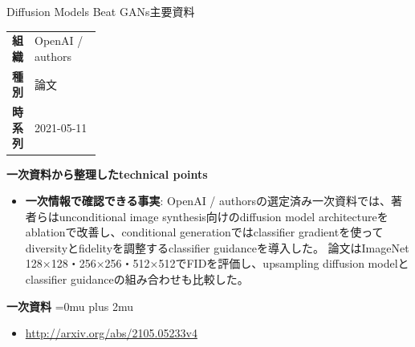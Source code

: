 \begin{technicalnote}{Diffusion Models Beat GANs}{主要資料}
\begingroup
\begin{tabularx}{\linewidth}{@{}>{\bfseries}p{0.22\linewidth}X@{}}
組織 & OpenAI / authors \\
種別 & 論文 \\
時系列 & 2021-05-11 \\
\end{tabularx}
\smallskip
{\bfseries 一次資料から整理したtechnical points}
\begin{itemize}[leftmargin=1.5em,itemsep=0.35em]
\item \textbf{一次情報で確認できる事実}: OpenAI / authorsの選定済み一次資料では、著者らはunconditional image synthesis向けのdiffusion model architectureをablationで改善し、conditional generationではclassifier gradientを使ってdiversityとfidelityを調整するclassifier guidanceを導入した。 論文はImageNet 128×128・256×256・512×512でFIDを評価し、upsampling diffusion modelとclassifier guidanceの組み合わせも比較した。
\end{itemize}
\begin{minipage}{\linewidth}
\begin{samepage}
{\bfseries 一次資料}
\begingroup\sloppy
\Urlmuskip=0mu plus 2mu\relax
\begin{itemize}[leftmargin=1.5em,itemsep=0.25em]
\item {\scriptsize\url{http://arxiv.org/abs/2105.05233v4}}
\end{itemize}
\endgroup
\end{samepage}
\end{minipage}
\endgroup
\end{technicalnote}
\medskip

